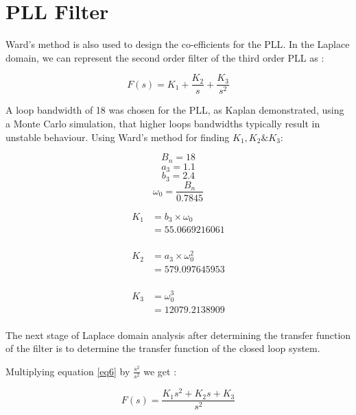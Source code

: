 \section{\ac{PLL} Filter}
Ward's method is also used to design the co-efficients for the \ac{PLL}. In the Laplace domain, we can represent the second order filter  of the third order \ac{PLL} as : 

\begin{equation} \label{eq6}
F(s) = K_1 + \frac{K_2}{s} + \frac{K_3}{s^2}
\end{equation}

A loop bandwidth of 18 was chosen for the \ac{PLL}, as Kaplan\cite{Kaplan} demonstrated, using a Monte Carlo simulation, that higher loops bandwidths typically result in unstable behaviour. 
Using Ward's method\cite{Ward} for finding $K_1,K_2\&K_3$:

$$B_n = 18$$
$$a_3=1.1$$
$$b_3=2.4$$
$$\omega_{0}=\frac{B_n}{0.7845}$$

\begin{equation} \label{eq3}
\begin{split}
K_1 & = b_3 \times \omega_{0}\\
    & = 55.0669216061\\
\end{split}
\end{equation}

\begin{equation} \label{eq4}
\begin{split}
K_2 & = a_3 \times \omega_{0}^2\\ 
    & = 579.097645953\\
\end{split}
\end{equation}

\begin{equation} \label{eq5}
\begin{split}
K_3 & = \omega_{0}^3\\
    & = 12079.2138909\\
\end{split}
\end{equation}


The next stage of Laplace domain analysis after determining the transfer function of the filter is to determine the transfer function of the closed loop system.

Multiplying equation \ref{eq6} by $\frac{s^2}{s^2}$ we get :

\begin{equation}
F(s) = \frac{K_1s^2 + K_2 s + K_3}{s^2}
\end{equation}

